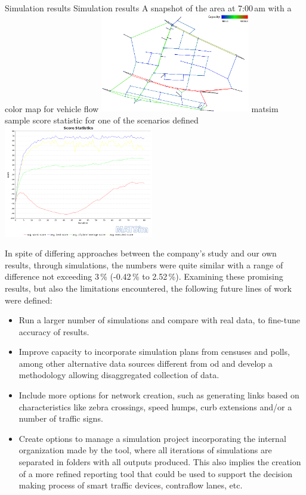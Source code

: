 \createfigure%
{Simulation results}%
{Simulation results}%
{\label{fig:caracasB}}%
{%
 \createsubfigure%
 {A snapshot of the area at 7:00\,am  with a color map for vehicle flow}
 {\includegraphics[width=0.49\textwidth, angle=0]{./scenarios/figures/caracasB1.png}}
 {\label{fig:caracasBleft}}
\createsubfigure%
 {\gls{matsim} sample score statistic for one of the scenarios defined}
 {\includegraphics[width=0.49\textwidth, angle=0]{./scenarios/figures/caracasB2.png}}
 {\label{fig:caracasBright}}
}%
{}

In spite of differing approaches between the company's study and our own results, through simulations, the numbers were quite similar with a range of difference not exceeding 3\,\% (-0.42\,\% to 2.52\,\%). Examining these promising results, but also the limitations encountered, the following future lines of work were defined:

\begin{itemize}\styleItemize
\item Run a larger number of simulations and compare with real data, to fine-tune accuracy of results.

\item Improve capacity to incorporate simulation plans from censuses and polls, among other alternative data sources different from \gls{od} and develop a methodology allowing disaggregated collection of data.

\item Include more options for network creation, such as generating links based on characteristics like zebra crossings, speed humps, curb extensions and/or a number of traffic signs.

\item Create options to manage a simulation project incorporating the internal organization made by the tool, where all iterations of simulations are separated in folders with all outputs produced. This also implies the creation of a more refined reporting tool that could be used to support the decision making process of smart traffic devices, contraflow lanes, etc.
\end{itemize}


